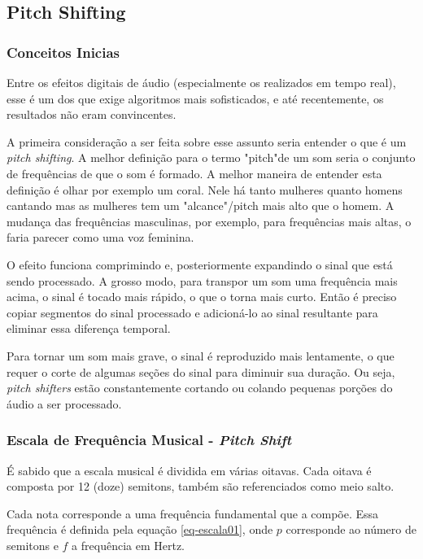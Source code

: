 	\subsection{Pitch Shifting}
	\label{introd-pitch-shift}
	
		\subsubsection{Conceitos Inicias}
		
			Entre os efeitos digitais de áudio (especialmente os realizados em tempo real), esse é um dos que exige algoritmos mais sofisticados, e até recentemente, os resultados não eram convincentes. 
			
			A primeira consideração a ser feita sobre esse assunto seria entender o que é um \textit{pitch shifting}. A melhor definição para o termo "pitch"de um som seria o conjunto de frequências de que o som é formado. A melhor maneira de entender esta definição é olhar por exemplo um coral. Nele há tanto mulheres quanto homens cantando mas as mulheres tem um "alcance"/pitch mais alto que o homem. A mudança das frequências masculinas, por exemplo, para frequências mais altas, o faria
			parecer como uma voz feminina.
			
			O efeito funciona comprimindo e, posteriormente expandindo o sinal que está sendo processado. A grosso modo, para transpor um som uma frequência mais acima, o sinal é tocado mais rápido, o que o torna mais curto. Então é preciso copiar segmentos do sinal processado e adicioná-lo ao sinal resultante para eliminar essa diferença temporal. 
			
			Para tornar um som mais grave, o sinal é reproduzido mais lentamente, o que requer o corte de algumas seções do sinal para diminuir sua duração. Ou seja, \textit{pitch shifters} estão constantemente cortando ou colando pequenas porções do áudio a ser processado.
			
		\subsubsection{Escala de Frequência Musical - \textit{Pitch Shift}}
			É sabido que a escala musical é dividida em várias oitavas. Cada oitava é composta por 12 (doze) semitons, também são referenciados como meio salto.
			
			Cada nota corresponde a uma frequência fundamental que a compõe. Essa frequência é definida pela equação \ref{eq-escala01}, onde $ p $ corresponde ao número de semitons e $ f $ a frequência em Hertz.
			
